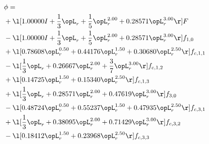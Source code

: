 \begin{alignat}{2} 
\label{eq:scalarFlux_0} 
& \phi = \\ 
& + \l[  1.00000 I + \frac{1}{3} \opL_r + \frac{1}{5} \opL_r^{2.00} +  0.28571 \opL_r^{3.00}  \r] F \nonumber \\ 
& - \l[  1.00000 I + \frac{1}{3} \opL_r + \frac{1}{5} \opL_r^{2.00} +  0.28571 \opL_r^{3.00}  \r] f_{1,0} \nonumber \\ 
& + \l[  0.78608 \opL_r^{0.50} +  0.44176 \opL_r^{1.50} +  0.30680 \opL_r^{2.50}  \r] f_{c,1,1} \nonumber \\ 
& - \l[ \frac{1}{3} \opL_r +  0.26667 \opL_r^{2.00} + \frac{3}{7} \opL_r^{3.00}  \r] f_{c,1,2} \nonumber \\ 
& + \l[  0.14725 \opL_r^{1.50} +  0.15340 \opL_r^{2.50}  \r] f_{c,1,3} \nonumber \\ 
& + \l[ \frac{1}{3} \opL_r +  0.28571 \opL_r^{2.00} +  0.47619 \opL_r^{3.00}  \r] f_{3,0} \nonumber \\ 
& - \l[  0.48724 \opL_r^{0.50} +  0.55237 \opL_r^{1.50} +  0.47935 \opL_r^{2.50}  \r] f_{c,3,1} \nonumber \\ 
& + \l[ \frac{1}{3} \opL_r +  0.38095 \opL_r^{2.00} +  0.71429 \opL_r^{3.00}  \r] f_{c,3,2} \nonumber \\ 
& - \l[  0.18412 \opL_r^{1.50} +  0.23968 \opL_r^{2.50}  \r] f_{c,3,3} \nonumber \\ 
\end{alignat} 


